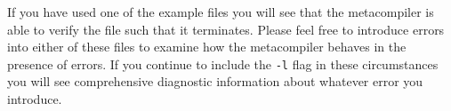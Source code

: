 If you have used one of the example files you will see that the metacompiler is able to verify the file such that it terminates.
Please feel free to introduce errors into either of these files to examine how the metacompiler behaves in the presence of errors. 
If you continue to include the \texttt{-l} flag in these circumstances you will see comprehensive diagnostic information about whatever error you introduce. 



